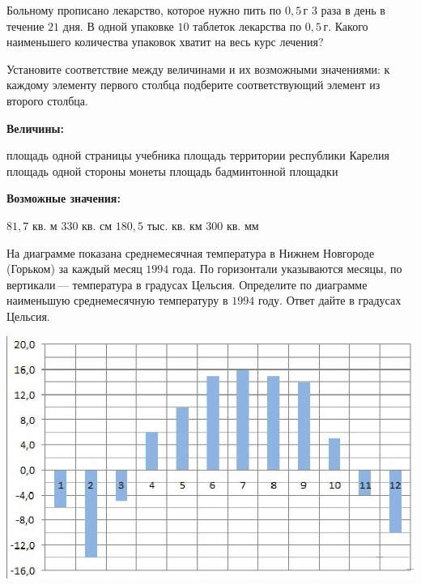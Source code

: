 \begin{homework}[number=3]
	\begin{listofex}
		\item Больному прописано лекарство, которое нужно пить по \(0,5\) г \(3\) раза в день в течение \(21\) дня. В одной упаковке \(10\) таблеток лекарства по \(0,5\) г. Какого наименьшего количества упаковок хватит на весь курс лечения?
		\item Установите соответствие между величинами и их возможными значениями: к каждому элементу первого столбца подберите соответствующий элемент из второго столбца. \\
		\begin{minipage}[t]{0.58\linewidth}
			\textbf{Величины:}
			\begin{tasks}
				\task площадь одной страницы учебника
				\task площадь территории республики Карелия
				\task площадь одной стороны монеты
				\task площадь бадминтонной площадки
			\end{tasks}
		\end{minipage}
		\hspace{0.05\linewidth}
		\begin{minipage}[t]{\textwidth}
			\textbf{Возможные значения:}
			\begin{tasks}
				\task \(81,7\) кв. м
				\task \(330\) кв. см
				\task \(180,5\) тыс. кв. км
				\task \(300\) кв. мм
			\end{tasks}
		\end{minipage}
		\item
		\begin{minipage}[t]{0.5\linewidth}
			На диаграмме показана среднемесячная температура в Нижнем Новгороде (Горьком) за каждый месяц \(1994\) года. По горизонтали указываются месяцы, по вертикали --- температура в градусах Цельсия. Определите по диаграмме наименьшую среднемесячную температуру в \(1994\) году. Ответ дайте в градусах Цельсия.
		\end{minipage}
		\hspace{0.02\linewidth}
		\begin{minipage}[t]{0.45\linewidth}
			\includegraphics[align=t, width=\linewidth]{../pics/G101M8H3-3}

\end{minipage}
\end{listofex}
\end{homework}
